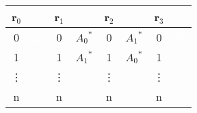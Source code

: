\begin{figure}
		\begin{center}
			\begin{tabular}{ c c | c c | c c | c c } 
			\hspace{.1cm}  r$_0$ \hspace{.1cm} & &  \hspace{.1cm} r$_1$ \hspace{.1cm} & & \hspace{.1cm} r$_2$ \hspace{.1cm}  & & \hspace{.1cm} r$_3$ \hspace{.1cm} \\[1mm]  
			\hline  	
		  	\Tstrut \hspace{.1cm} 0 \hspace{.1cm} & \textcolor{white}{a$_0$} \hspace{.1cm} &  \hspace{.1cm} 0 \hspace{.1cm} & ${A_0}^*$ \hspace{.1cm} &  \hspace{.1cm} 0 \hspace{.1cm}  & ${A_1}^*$ \hspace{.1cm} & \hspace{.1cm} 0 \hspace{.1cm} & \textcolor{white}{$a_0$} \hspace{.1cm} \\[1mm]
		  	 \hspace{.1cm} 1 \hspace{.1cm} & &  \hspace{.1cm} 1 \hspace{.1cm} & ${A_1}^*$ \hspace{.1cm} &  \hspace{.1cm} 1 \hspace{.1cm}  & ${A_0}^*$ \hspace{.1cm} & \hspace{.1cm} 1 \hspace{.1cm} \\[1mm]
		  	  \hspace{.01cm} \vdots \hspace{.1cm} & &  \hspace{.01cm} \vdots  \hspace{.1cm} & &  \hspace{.01cm} \vdots  \hspace{.1cm}  &  & \hspace{.01cm} \vdots  \hspace{.1cm} \\[1mm]
		  	 \hspace{.1cm} n \hspace{.1cm} & &  \hspace{.1cm} n \hspace{.1cm} & &  \hspace{.1cm} n \hspace{.1cm}  &  & \hspace{.1cm} n \hspace{.1cm} 
		\end{tabular}
		

\end{center}
\end{figure}
